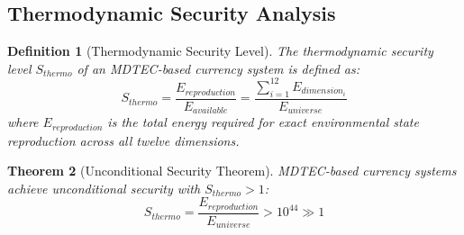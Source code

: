 \documentclass[12pt,a4paper]{article}
\newtheorem{theorem}{Theorem}
\newtheorem{definition}[theorem]{Definition}
\begin{document}
\subsection{Thermodynamic Security Analysis}

\begin{definition}[Thermodynamic Security Level]
The thermodynamic security level $S_{thermo}$ of an MDTEC-based currency system is defined as:
\begin{equation}
S_{thermo} = \frac{E_{reproduction}}{E_{available}} = \frac{\sum_{i=1}^{12} E_{dimension_i}}{E_{universe}}
\end{equation}
where $E_{reproduction}$ is the total energy required for exact environmental state reproduction across all twelve dimensions.
\end{definition}

\begin{theorem}[Unconditional Security Theorem]
MDTEC-based currency systems achieve unconditional security with $S_{thermo} > 1$:
\begin{equation}
S_{thermo} = \frac{E_{reproduction}}{E_{universe}} > 10^{44} \gg 1
\end{equation}
\end{theorem}
\end{document}
